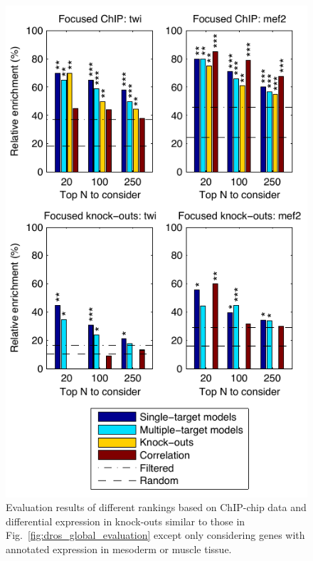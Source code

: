\documentclass{pnastwo}
\begin{document}
\begin{article}
\begin{figure}[tb]
  \centering
  \includegraphics{dros_focused_evaluation}
  \caption{Evaluation results of different rankings based on
    ChIP-chip data and differential expression in knock-outs
    similar to those in
    Fig.~\ref{fig:dros_global_evaluation} except only considering genes
    with annotated expression in mesoderm or muscle tissue.
\label{fig:dros_focused_evaluation}
}
\end{figure}


\end{article}
\end{document}
